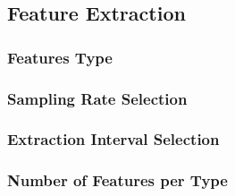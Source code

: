 \subsection{Feature Extraction}

\subsubsection{Features Type}  %

\subsubsection{Sampling Rate Selection} %

\subsubsection{Extraction Interval Selection}  %

\subsubsection{Number of Features per Type} %
